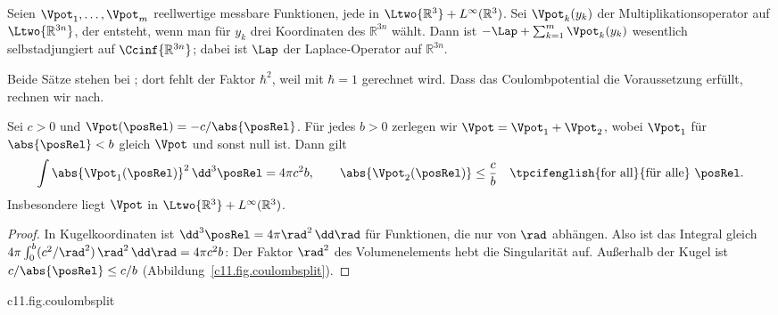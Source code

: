 \begin{fundament}
  \begin{theorem}\label{c11.thm.kato16}
    Seien $\Vpot_1, \ldots, \Vpot_m$ reellwertige messbare Funktionen, jede in
    $\Ltwo{\mathbb{R}^3} + L^{\infty}(\mathbb{R}^3)$. Sei $\Vpot_k(y_k)$ der
    Multiplikationsoperator auf $\Ltwo{\mathbb{R}^{3n}}$, der entsteht, wenn man für
    $y_k$ drei Koordinaten des $\mathbb{R}^{3n}$ wählt. Dann ist
    $-\Lap + \sum_{k = 1}^{m} \Vpot_k(y_k)$ wesentlich selbstadjungiert auf
    $\Ccinf{\mathbb{R}^{3n}}$; dabei ist $\Lap$ der Laplace-Operator auf
    $\mathbb{R}^{3n}$.
  \end{theorem}

  Beide Sätze stehen bei ; dort fehlt der Faktor
  $\hbar^2$, weil mit $\hbar = 1$ gerechnet wird. Dass das Coulombpotential die
  Voraussetzung erfüllt, rechnen wir nach.

  \begin{lemma}\label{c11.lem.coulomb}
    Sei $c > 0$ und $\Vpot(\posRel) = -c/\abs{\posRel}$. Für jedes $b > 0$ zerlegen wir
    $\Vpot = \Vpot_1 + \Vpot_2$, wobei $\Vpot_1$ für $\abs{\posRel} < b$ gleich $\Vpot$
    und sonst null ist. Dann gilt
    \begin{equation}\label{c11.eq.coulombsplit}
      \int \abs{\Vpot_1(\posRel)}^2\,\dd^3\posRel = 4\pi c^2 b,
      \qquad
      \abs{\Vpot_2(\posRel)} \leq \frac{c}{b}\quad\text{\tpcifenglish{for all}{für alle}}\ \posRel .
    \end{equation}
    Insbesondere liegt $\Vpot$ in $\Ltwo{\mathbb{R}^3} + L^{\infty}(\mathbb{R}^3)$.
  \end{lemma}
  \begin{proof}
    In Kugelkoordinaten ist $\dd^3\posRel = 4\pi\rad^2\,\dd\rad$ für Funktionen, die nur
    von $\rad$ abhängen. Also ist das Integral gleich
    $4\pi\int_0^b (c^2/\rad^2)\,\rad^2\,\dd\rad = 4\pi c^2 b$: Der Faktor $\rad^2$ des
    Volumenelements hebt die Singularität auf. Außerhalb der Kugel ist
    $c/\abs{\posRel} \leq c/b$ (Abbildung~\ref{c11.fig.coulombsplit}).
  \end{proof}

  \begin{tpcfigure}{c11.fig.coulombsplit}
    \caption{Die Zerlegung aus Lemma~\ref{c11.lem.coulomb}. Innerhalb des Radius $b$
      (durchgezogen) wächst $\abs{\Vpot}$ über alle Grenzen, ist aber
      quadratintegrierbar; außerhalb (gestrichelt) ist $\abs{\Vpot}$ durch $c/b$
      beschränkt.}
  \end{tpcfigure}


\end{fundament}
